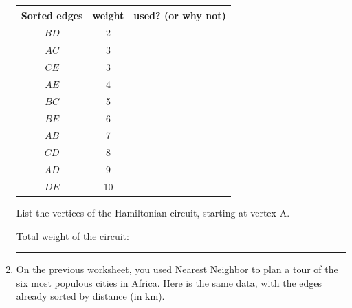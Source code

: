 \documentclass[12pt]{article}
\newcommand{\ans}[1][1in]{\rule{#1}{.5pt}}
\begin{document}
\begin{enumerate}
\bigskip

\begin{adjustbox}{valign=t,minipage={.5\linewidth}}
\begin{tabular}{ c | c | p{1.6in} }
Sorted edges & weight & used? (or why not) \\ \hline
$BD$ & 2 & \\ \hline
$AC$ & 3 & \\ \hline
$CE$ & 3 & \\ \hline
$AE$ & 4 & \\ \hline
$BC$ & 5 & \\ \hline
$BE$ & 6 & \\ \hline
$AB$ & 7 & \\ \hline
$CD$ & 8 & \\ \hline
$AD$ & 9 & \\ \hline
$DE$ & 10 & \\ \hline
\end{tabular}
\end{adjustbox}
\hfill
\begin{adjustbox}{valign=t,minipage={.42\linewidth}}
\raggedright
List the vertices of the Hamiltonian circuit, starting at vertex A.

\medskip
\hrulefill

\bigskip

Total weight of the circuit: \ans

\bigskip

\end{adjustbox}

\vfill

\newpage

\item On the previous worksheet, you used Nearest Neighbor to plan a tour of the six most populous cities in Africa. Here is the same data, with the edges already sorted by distance (in km).

\medskip


\end{enumerate}
\end{document}
